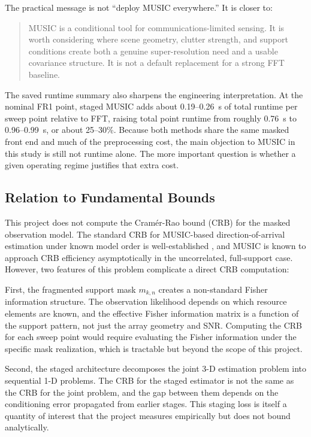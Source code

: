 \documentclass[11pt]{article}
\begin{document}
The practical message is not ``deploy MUSIC everywhere.'' It is closer to:
\begin{quote}
MUSIC is a conditional tool for communications-limited sensing. It is worth considering where scene geometry, clutter strength, and support conditions create both a genuine super-resolution need and a usable covariance structure. It is not a default replacement for a strong FFT baseline.
\end{quote}

The saved runtime summary also sharpens the engineering interpretation. At the nominal FR1 point, staged MUSIC adds about 0.19--0.26~s of total runtime per sweep point relative to FFT, raising total point runtime from roughly 0.76~s to 0.96--0.99~s, or about 25--30\%. Because both methods share the same masked front end and much of the preprocessing cost, the main objection to MUSIC in this study is still not runtime alone. The more important question is whether a given operating regime justifies that extra cost.

\subsection{Relation to Fundamental Bounds}

This project does not compute the Cram\'{e}r-Rao bound (CRB) for the masked observation model. The standard CRB for MUSIC-based direction-of-arrival estimation under known model order is well-established \cite{stoica1989}, and MUSIC is known to approach CRB efficiency asymptotically in the uncorrelated, full-support case. However, two features of this problem complicate a direct CRB computation:

First, the fragmented support mask $m_{k,n}$ creates a non-standard Fisher information structure. The observation likelihood depends on which resource elements are known, and the effective Fisher information matrix is a function of the support pattern, not just the array geometry and SNR. Computing the CRB for each sweep point would require evaluating the Fisher information under the specific mask realization, which is tractable but beyond the scope of this project.

Second, the staged architecture decomposes the joint 3-D estimation problem into sequential 1-D problems. The CRB for the staged estimator is not the same as the CRB for the joint problem, and the gap between them depends on the conditioning error propagated from earlier stages. This staging loss is itself a quantity of interest that the project measures empirically but does not bound analytically.
\end{document}
